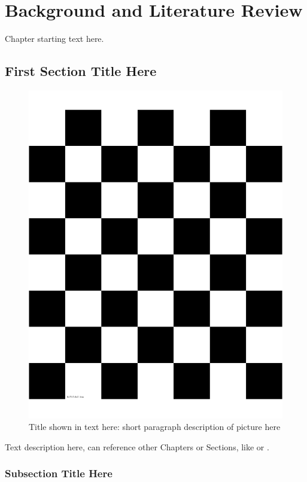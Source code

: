 \chapter{Background and Literature Review}
\label{ch:background}
\glsresetall
{
Chapter starting text here.}

\section{First Section Title Here}
\label{sec:sectionRefNameHere}

\begin{figure}[tb!] %
	\centering
	\includegraphics[width = 0.75\columnwidth]{Figures/checkerboard7x6x50x50cm.png}
	\caption[TOC Figure Name]{Title shown in text here: short paragraph description of picture here}
	\label{fig:examplePicture}
\end{figure}

Text description here, can reference other Chapters or Sections, like  or .

\subsection[Optional TOC Subsection Title Here]{Subsection Title Here}
\label{sec:subsectionRefNameHere}

